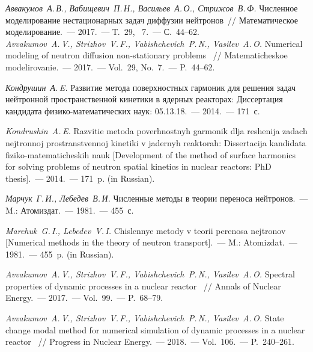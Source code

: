 \documentclass{crm-article}
\begin{document}
\begin{thebibliography}

 {\it Аввакумов~А.\,В., Вабищевич~П.\,Н., Васильев~А.\,О., Стрижов~В.\,Ф.} 
Численное моделирование нестационарных задач диффузии нейтронов~// Математическое моделирование.~--- 2017.~--- Т.~29, \No~7.~--- С.~44--62.
\\
{\footnotesize{\it Avvakumov~A.\,V., Strizhov~V.\,F., Vabishchevich~P.\,N., Vasilev~A.\,O.}
Numerical modeling of neutron diffusion non-stationary problems ~// Matematicheskoe modelirovanie.~--- 2017.~--- Vol.~29, No.~7.~--- P.~44--62.}

 {\it Кондрушин~А.\,E.} 
Развитие метода поверхностных гармоник для решения задач нейтронной пространственной кинетики в ядерных реакторах: Диссертация кандидата физико-математических наук: 05.13.18.~--- 2014.~--- 171~с.
\\
{\footnotesize{\it Kondrushin~A.\,E.}
Razvitie metoda poverhnostnyh garmonik dlja reshenija zadach nejtronnoj prostranstvennoj kinetiki v jadernyh reaktorah: Dissertacija kandidata fiziko-matematicheskih nauk [Development of the method of surface harmonics for solving problems of neutron spatial kinetics in nuclear reactors: PhD thesis].~--- 2014.~--- 171~p. (in Russian).\par}


 {\it Марчук~Г.\,И., Лебедев~В.\,И.} 
Численные методы в теории переноса нейтронов.~--- M.: Атомиздат.~--- 1981.~--- 455~с.
\\
{\footnotesize{\it Marchuk~G.\,I., Lebedev~V.\,I.}
Chislennye metody v teorii perenosa nejtronov [Numerical methods in the theory of neutron transport].~--- M.: Atomizdat.~--- 1981.~--- 455~p. (in Russian).\par}
    
 {\it Avvakumov~A.\,V., Strizhov~V.\,F., Vabishchevich~P.\,N., Vasilev~A.\,O.} Spectral properties of dynamic processes in a nuclear reactor ~// Annals of Nuclear Energy.~--- 2017.~--- Vol.~99.~--- P.~68--79.

 {\it Avvakumov~A.\,V., Strizhov~V.\,F., Vabishchevich~P.\,N., Vasilev~A.\,O.} State change modal method for numerical simulation of dynamic processes in a nuclear reactor ~// Progress in Nuclear Energy.~--- 2018.~--- Vol.~106.~--- P.~240--261.


\end{thebibliography}
\end{document}
